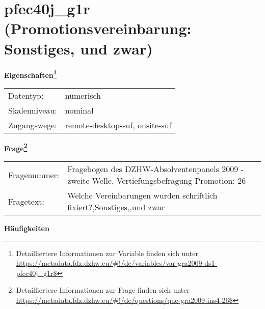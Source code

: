 
    \setcounter{footnote}{0}

    \vspace*{-1.8cm}
	\section{pfec40j\_g1r (Promotionsvereinbarung: Sonstiges, und zwar)}
	\label{section:pfec40j_g1r}



    \vspace*{0.5cm}
    \noindent\textbf{Eigenschaften\footnote{Detailliertere Informationen zur Variable finden sich unter
		\url{https://metadata.fdz.dzhw.eu/\#!/de/variables/var-gra2009-ds1-pfec40j_g1r$}}}\\
	\begin{tabularx}{\hsize}{@{}lX}
	Datentyp: & numerisch \\
	Skalenniveau: & nominal \\
	Zugangswege: &
	  remote-desktop-suf, 
	  onsite-suf
 \\
    \end{tabularx}



				\vspace*{0.5cm}
                \noindent\textbf{Frage\footnote{Detailliertere Informationen zur Frage finden sich unter
		              \url{https://metadata.fdz.dzhw.eu/\#!/de/questions/que-gra2009-ins4-26$}}}\\
				\begin{tabularx}{\hsize}{@{}lX}
					Fragenummer: &
					  Fragebogen des DZHW-Absolventenpanels 2009 - zweite Welle, Vertiefungsbefragung Promotion:
					  26
 \\
					Fragetext: & Welche Vereinbarungen wurden schriftlich fixiert?,Sonstiges,,und zwar \\
				\end{tabularx}





        		\vspace*{0.5cm}
                \noindent\textbf{Häufigkeiten}

